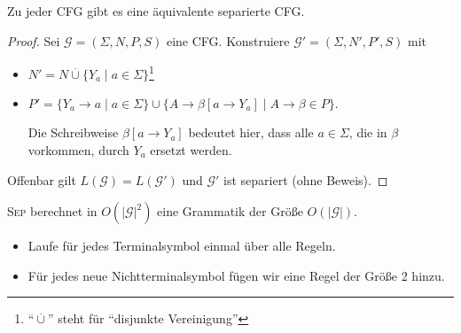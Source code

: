 \begin{lemma}
  Zu jeder \ac{CFG} gibt es eine äquivalente separierte \ac{CFG}.
\end{lemma}
\begin{proof}
  Sei $\mathcal{G} = (\Sigma, N, P, S)$ eine \ac{CFG}.
  Konstruiere $\mathcal{G}' = (\Sigma, N', P', S)$ mit
  \begin{itemize}
  \item $N' = N \overset.\cup \{Y_a \mid a \in \Sigma \}$\footnote{"`$\overset.\cup$"' steht für "`disjunkte Vereinigung"'}
  \item $P' = \{Y_a \to a \mid a \in \Sigma \} \cup \{A \to \beta[a \to Y_a] \mid A \to \beta \in P \}$.
  
    Die Schreibweise $\beta[a\to Y_a]$ bedeutet hier, dass alle $a \in \Sigma$, die in $\beta$ vorkommen, durch $Y_a$ ersetzt werden.
  \end{itemize}
  Offenbar gilt $L(\mathcal{G}) = L(\mathcal{G'})$ und $\mathcal{G}'$ ist separiert (ohne Beweis).
\end{proof}
\begin{Bemerkung}
\textsc{Sep} berechnet in $O(|\mathcal{G}|^2)$ eine Grammatik der Größe $O(|\mathcal{G}|)$.
\begin{itemize}
	\item Laufe für jedes Terminalsymbol einmal über alle Regeln.
	
	\item Für jedes neue Nichtterminalsymbol fügen wir eine Regel der Größe 2 hinzu.
	\qedhere
\end{itemize}
\end{Bemerkung}




